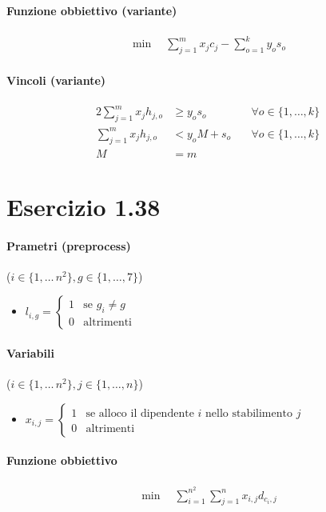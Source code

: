 \documentclass{article}
\begin{document}
\paragraph{Funzione obbiettivo (variante)}
\begin{align*}
  \min \quad \sum_{j=1}^m x_j c_j - \sum_{o=1}^k y_o s_o
\end{align*}

\paragraph{Vincoli (variante)}
\begin{alignat}{2}
  \sum_{j=1}^m x_j h_{j,o} &\geq y_o s_o \quad &\forall o \in \{1,\ldots,k\} \\
  \sum_{j=1}^m x_j h_{j,o} &< y_oM + s_o \quad &\forall o \in \{1,\ldots,k\} \\
  M &= m &
\end{alignat}

\pagebreak
\section{Esercizio 1.38}

\paragraph{Prametri (preprocess)} ($i \in \{1,\ldots\,n^2\}, g \in \{1,\ldots,7\}$)
\begin{itemize}
  \item $l_{i,g} = \begin{cases}
      1 & \text{se }g_i \neq g \\
      0 & \text{altrimenti}
  \end{cases}$
\end{itemize}

\paragraph{Variabili} ($i \in \{1,\ldots\,n^2\}, j \in \{1,\ldots,n\}$)
\begin{itemize}
  \item $x_{i,j} = \begin{cases}
    1 &\text{se alloco il dipendente }i\text{ nello stabilimento }j \\
    0 &\text{altrimenti}
  \end{cases}$
\end{itemize}

\paragraph{Funzione obbiettivo}
\begin{align*}
  \min \quad \sum_{i=1}^{n^2} \sum_{j=1}^n x_{i,j} d_{c_i,j}
\end{align*}
\end{document}
